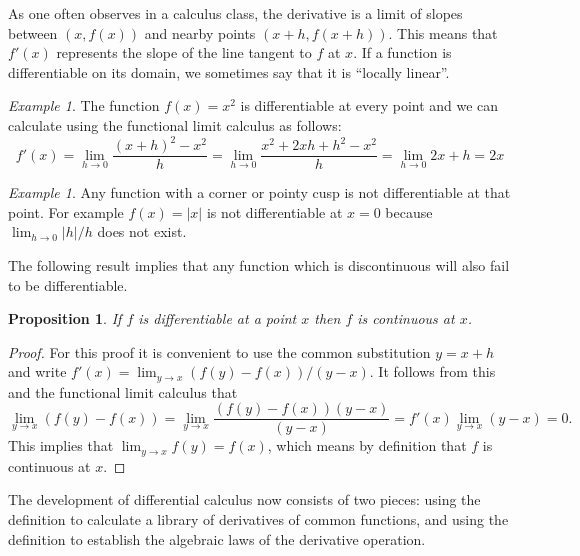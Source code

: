 \documentclass[11pt,oneside]{amsbook}
\theoremstyle{definition}
\theoremstyle{plain}
\newtheorem{prop}[thm]{Proposition}
\theoremstyle{definition}
\theoremstyle{remark}
\newtheorem{example}[thm]{Example}
\numberwithin{equation}{section}
\numberwithin{figure}{section}
\begin{document}
As one often observes in a calculus class, the derivative is a limit of slopes between $(x,f(x))$ and nearby points $(x+h,f(x+h))$. This means that $f'(x)$ represents the slope of the line tangent to $f$ at $x$. If a function is differentiable on its domain, we sometimes say that it is ``locally linear''.

\begin{example}
  The function $f(x)=x^2$ is differentiable at every point and we can calculate using the functional limit calculus as follows:
  \[f'(x)=\lim_{h\to0}\frac{(x+h)^2-x^2}{h}
  =\lim_{h\to0}\frac{x^2+2xh+h^2-x^2}{h}=\lim_{h\to0}2x+h=2x
  \]
\end{example}

\begin{example}
  Any function with a corner or pointy cusp is not differentiable at that point. For example $f(x)=|x|$ is not differentiable at $x=0$ because $\lim_{h\to0}|h|/h$ does not exist.
\end{example}

The following result implies that any function which is discontinuous will also fail to be differentiable.

\begin{prop}
  If $f$ is differentiable at a point $x$ then $f$ is continuous at $x$.
\end{prop}

\begin{proof}
  For this proof it is convenient to use the common substitution $y=x+h$ and write $f'(x)=\lim_{y\to x}(f(y)-f(x))/(y-x)$. It follows from this and the functional limit calculus that
\[\lim_{y\to x}(f(y)-f(x))=\lim_{y\to x}\frac{(f(y)-f(x))(y-x)}{(y-x)}
=f'(x)\lim_{y\to x}(y-x)=0\text{.}
\]
This implies that $\lim_{y\to x}f(y)=f(x)$, which means by definition that $f$ is continuous at $x$.
\end{proof}

The development of differential calculus now consists of two pieces: using the definition to calculate a library of derivatives of common functions, and using the definition to establish the algebraic laws of the derivative operation.
\end{document}

